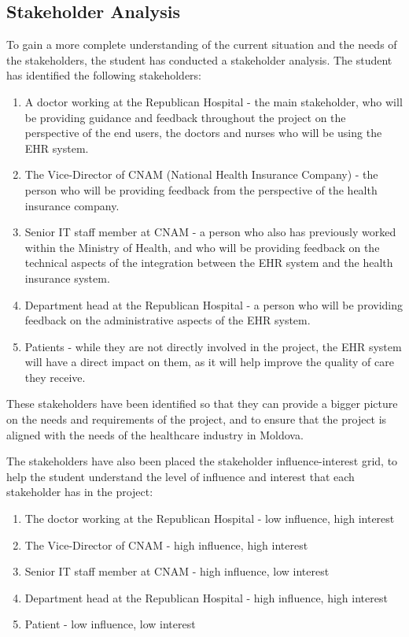 \subsection{Stakeholder Analysis}

To gain a more complete understanding of the current situation and the needs of the stakeholders, the student has conducted a stakeholder analysis. The student has identified the following stakeholders:

\begin{enumerate}
    \item A doctor working at the Republican Hospital - the main stakeholder, who will be providing guidance and feedback throughout the project on the perspective of the end users, the doctors and nurses who will be using the EHR system.
    \item The Vice-Director of CNAM (National Health Insurance Company) - the person who will be providing feedback from the perspective of the health insurance company.
    \item Senior IT staff member at CNAM - a person who also has previously worked within the Ministry of Health, and who will be providing feedback on the technical aspects of the integration between the EHR system and the health insurance system.
    \item Department head at the Republican Hospital - a person who will be providing feedback on the administrative aspects of the EHR system.
    \item Patients - while they are not directly involved in the project, the EHR system will have a direct impact on them, as it will help improve the quality of care they receive.
\end{enumerate}

These stakeholders have been identified so that they can provide a bigger picture on the needs and requirements of the project, and to ensure that the project is aligned with the needs of the healthcare industry in Moldova. 

The stakeholders have also been placed the stakeholder influence-interest grid, to help the student understand the level of influence and interest that each stakeholder has in the project:

\begin{enumerate}
    \item The doctor working at the Republican Hospital - low influence, high interest
    \item The Vice-Director of CNAM - high influence, high interest
    \item Senior IT staff member at CNAM - high influence, low interest
    \item Department head at the Republican Hospital - high influence, high interest
    \item Patient - low influence, low interest
\end{enumerate}

